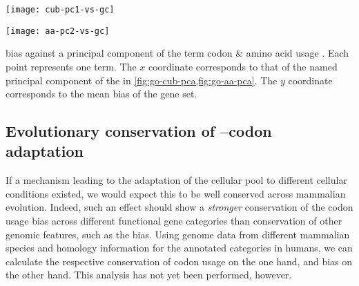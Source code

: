     {%
        \begin{minipage}{0.5\textwidth}
            \texttt{[image: cub-pc1-vs-gc]}%
        \end{minipage}%
        \begin{minipage}{0.5\textwidth}
            \texttt{[image: aa-pc2-vs-gc]}%
        \end{minipage}%
    }
    {\gc bias against a principal component of the \go term codon \& amino acid
    usage \pca.}
    {Each point represents one \go term. The \(x\) coordinate corresponds to
    that of the named principal component of the \pca in
    \cref{fig:go-cub-pca,fig:go-aa-pca}. The \(y\) coordinate corresponds to
    the mean \gc bias of the \go gene set.}

\subsection{Evolutionary conservation of --codon adaptation}

If a mechanism leading to the adaptation of the cellular \trna pool to different
cellular conditions existed, we would expect this to be well conserved across
mammalian evolution. Indeed, such an effect should show a \emph{stronger}
conservation of the codon usage bias across different functional gene categories
than conservation of other genomic features, such as the \gc bias. Using genome
data from different mammalian species and homology information for the annotated
\go categories in humans, we can calculate the respective conservation of codon
usage on the one hand, and \gc bias on the other hand. This analysis has not yet
been performed, however.
